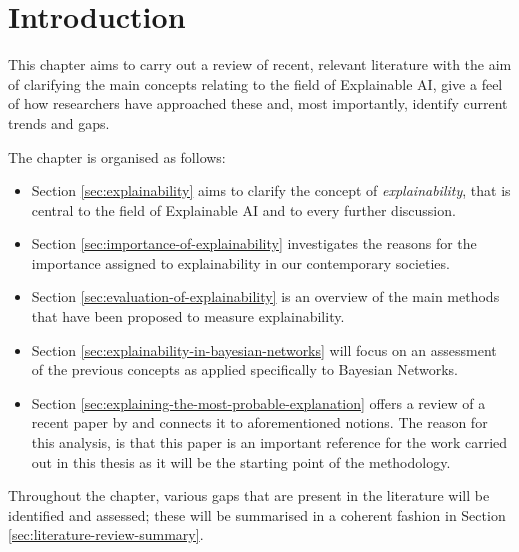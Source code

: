 \section{Introduction} \label{sec:literature-review-introduction}
This chapter aims to carry out a review of recent, relevant literature with the aim of clarifying the main concepts relating to the field of Explainable AI, give a feel of how researchers have approached these and, most importantly, identify current trends and gaps.

The chapter is organised as follows:
\begin{itemize}
  \item Section \ref{sec:explainability} aims to clarify the concept of \textit{explainability}, that is central to the field of Explainable AI and to every further discussion.
  \item Section \ref{sec:importance-of-explainability} investigates the reasons for the importance assigned to explainability in our contemporary societies.
  \item Section \ref{sec:evaluation-of-explainability} is an overview of the main methods that have been proposed to measure explainability.
  \item Section \ref{sec:explainability-in-bayesian-networks} will focus on an assessment of the previous concepts as applied specifically to Bayesian Networks.
  \item Section \ref{sec:explaining-the-most-probable-explanation} offers a review of a recent paper by \citet{Butz2018} and connects it to aforementioned notions.
  The reason for this analysis, is that this paper is an important reference for the work carried out in this thesis as it will be the starting point of the methodology.
\end{itemize}

Throughout the chapter, various gaps that are present in the literature will be identified and assessed; these will be summarised in a coherent fashion in Section \ref{sec:literature-review-summary}.